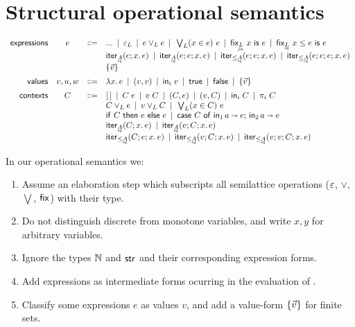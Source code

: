 \documentclass{article}
\begin{document}
\section{Structural operational semantics}

\[\begin{array}{rccl}
  \textsf{expressions} & e
  &\bnfeq& ... \pipe \unit_L \pipe e \vee_L e \pipe \tforin{L}{x \in e} e
  \pipe \tfix{\fineq{L}}{x}{e} \pipe \tfixle{\eq{L}}{x}{e}{e}\\
  &&& \iter{\eq{A}}{e}{x}{e} \pipe \iterstep{\eq{A}}{e}{e}{x}{e}
  \pipe \iterle{\eq{A}}{e}{e}{x}{e} \pipe \iterlestep{\eq{A}}{e}{e}{e}{x}{e}\\
  &&& \setlit{\vec{v}}
  \vspace{0.5em}\\
  \textsf{values} & v,u,w
  &\bnfeq& \fn\bind{x} e \pipe (v, v) \pipe \ms{in}_i\; v
  \pipe \ms{true} \pipe \ms{false} \pipe \setlit{\vec{v}}
  \vspace{0.5em}\\
  \textsf{contexts} & C
  &\bnfeq& \hole \pipe C\;e \pipe v\;C \pipe (C, e) \pipe (v, C) \pipe \ms{in}_i\;C
  \pipe \pi_i \; C\\
  &&& C \vee_L e \pipe v \vee_L C \pipe \tforin{L}{x \in C} e\\
  &&& \ifthen{C}{e}{e} \pipe \case{C}{a}{e}{a}{e}\\
  &&& \iter{\eq{A}}{C}{x}{e} \pipe \iterstep{\eq{A}}{v}{C}{x}{e}\\
  &&& \iterle{\eq{A}}{C}{e}{x}{e} \pipe \iterle{\eq{A}}{v}{C}{x}{e}
  \pipe \iterlestep{\eq{A}}{v}{v}{C}{x}{e}
\end{array}\]

\noindent In our operational semantics we:
\begin{enumerate}
\item Assume an elaboration step which subscripts all semilattice operations
($\varepsilon$, $\vee$, $\bigvee$, $\mathsf{fix}$) with their type.
\item Do not distinguish discrete from monotone variables, and write $x,y$ for
  arbitrary variables.
\item Ignore the types $\mathbb{N}$ and $\mathsf{str}$ and their corresponding expression forms.
\item Add 
expressions as intermediate forms ocurring in the evaluation of .
\item Classify some expressions $e$ as values $v$, and add a value-form
  $\{\vec{v}\}$ for finite sets.
\end{enumerate}
\end{document}

